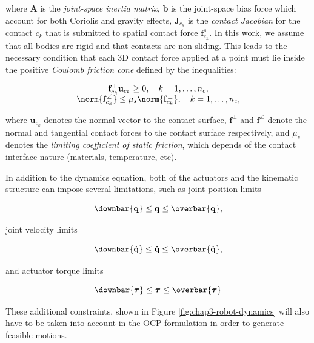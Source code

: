 where $\mathbf{A}$ is the \emph{joint-space inertia matrix},
$\mathbf{b}$ is the joint-space bias force which account for both
Coriolis and gravity effects, $\mathbf{J}_{c_k}$ is the \emph{contact
  Jacobian} for the contact $c_k$ that is submitted to spatial contact
force $\mathbf{f}^s_{c_k}$. In this work, we assume that all bodies
are rigid and that contacts are non-sliding. This leads to the
necessary condition that each 3D contact force applied at a point must
lie inside the positive \emph{Coulomb friction cone} \cite{trinkle1997dynamic}
defined by the inequalities:

\begin{equation}
  \label{eq:chap3-friction-cone}
  \begin{array}{c}
    \mathbf{f}_{c_k}^{\top}\mathbf{u}_{c_k} \ge 0, \quad k=1,\dots,n_c, \\
    \norm{\mathbf{f}_{c_k}^\angle} \le
    \mu_s\norm{\mathbf{f}_{c_k}^\bot}, \quad k=1,\dots,n_c,
  \end{array}
\end{equation}

where $\mathbf{u}_{c_k}$ denotes the normal vector to the contact
surface, $\mathbf{f}^\bot$ and $\mathbf{f}^\angle$ denote the normal
and tangential contact forces to the contact surface respectively, and
$\mu_s$ denotes the \emph{limiting coefficient of static friction},
which depends of the contact interface nature (materials, temperature,
etc).

In addition to the dynamics equation, both of the actuators and the
kinematic structure can impose several limitations, such as joint
position limits

\begin{equation}
  \downbar{\mathbf{q}} \le \mathbf{q} \le \overbar{\mathbf{q}},
\end{equation}

joint velocity limits

\begin{equation}
  \downbar{\mathbf{\dot{q}}} \le \mathbf{\dot{q}} \le
  \overbar{\mathbf{\dot{q}}},
\end{equation}

and actuator torque limits

\begin{equation}
  \downbar{\boldsymbol{\tau}} \le \boldsymbol{\tau} \le
  \overbar{\boldsymbol{\tau}}
\end{equation}

These additional constraints, shown in Figure
\ref{fig:chap3-robot-dynamics} will also have to be taken into account
in the OCP formulation in order to generate feasible motions.

